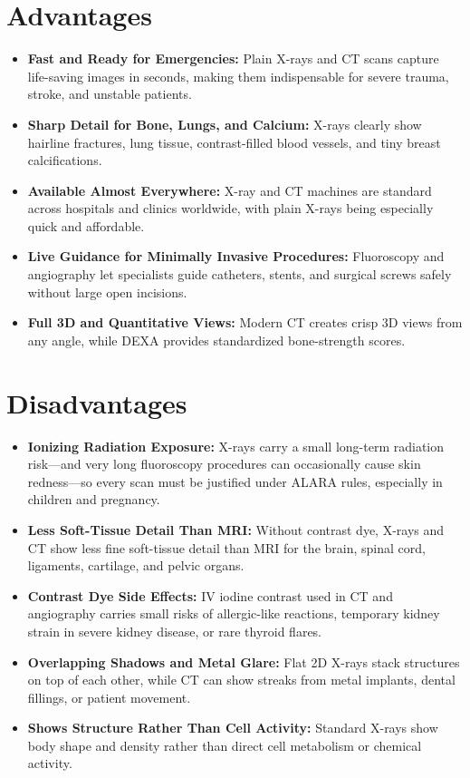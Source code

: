 \section{Advantages}
\begin{itemize}
  \item \textbf{Fast and Ready for Emergencies:} Plain X-rays and CT scans capture life-saving images in seconds, making them indispensable for severe trauma, stroke, and unstable patients.
  \item \textbf{Sharp Detail for Bone, Lungs, and Calcium:} X-rays clearly show hairline fractures, lung tissue, contrast-filled blood vessels, and tiny breast calcifications.
  \item \textbf{Available Almost Everywhere:} X-ray and CT machines are standard across hospitals and clinics worldwide, with plain X-rays being especially quick and affordable.
  \item \textbf{Live Guidance for Minimally Invasive Procedures:} Fluoroscopy and angiography let specialists guide catheters, stents, and surgical screws safely without large open incisions.
  \item \textbf{Full 3D and Quantitative Views:} Modern CT creates crisp 3D views from any angle, while DEXA provides standardized bone-strength scores.
\end{itemize}

\section{Disadvantages}
\begin{itemize}
  \item \textbf{Ionizing Radiation Exposure:} X-rays carry a small long-term radiation risk---and very long fluoroscopy procedures can occasionally cause skin redness---so every scan must be justified under ALARA rules, especially in children and pregnancy.
  \item \textbf{Less Soft-Tissue Detail Than MRI:} Without contrast dye, X-rays and CT show less fine soft-tissue detail than MRI for the brain, spinal cord, ligaments, cartilage, and pelvic organs.
  \item \textbf{Contrast Dye Side Effects:} IV iodine contrast used in CT and angiography carries small risks of allergic-like reactions, temporary kidney strain in severe kidney disease, or rare thyroid flares.
  \item \textbf{Overlapping Shadows and Metal Glare:} Flat 2D X-rays stack structures on top of each other, while CT can show streaks from metal implants, dental fillings, or patient movement.
  \item \textbf{Shows Structure Rather Than Cell Activity:} Standard X-rays show body shape and density rather than direct cell metabolism or chemical activity.
\end{itemize}

